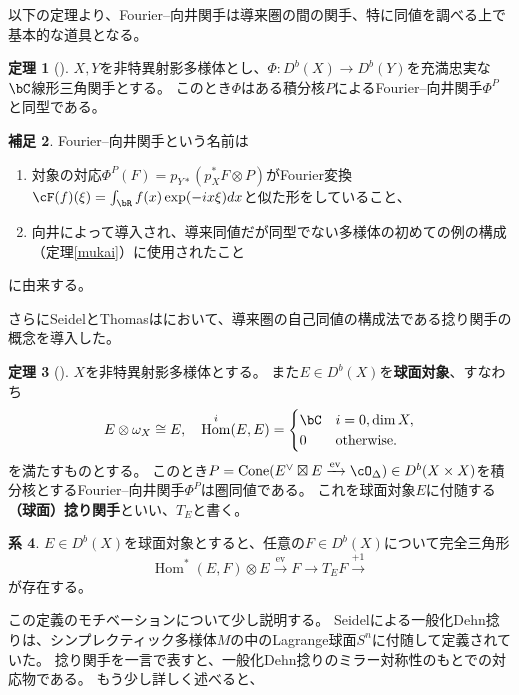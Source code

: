 \documentclass[uplatex,a4paper,dvipdfmx]{jsarticle}
\numberwithin{equation}{section}
\theoremstyle{definition}
\newtheorem{theorem}{定理}[section]
\newtheorem{corollary}[theorem]{系}
\newtheorem{remark}[theorem]{補足}
\DeclareMathOperator{\Hom}{\mathrm{Hom}}
\DeclareMathOperator{\Cone}{\mathrm{Cone}}
\DeclareMathOperator{\ev}{\mathrm{ev}}
\begin{document}
以下の定理より、Fourier--向井関手は導来圏の間の関手、特に同値を調べる上で基本的な道具となる。
\begin{theorem}[\cite{MR1465519}]
	$X, Y$を非特異射影多様体とし、$\Phi \colon D^b(X) \to D^b(Y)$を充満忠実な$\bC$線形三角関手とする。
	このとき$\Phi$はある積分核$P$によるFourier--向井関手$\Phi^P$と同型である。
\end{theorem}
\begin{remark}
	Fourier--向井関手という名前は
	\begin{enumerate}
		\item 対象の対応$\Phi^P(F) = p_{Y*}(p_X^*F \otimes P)$がFourier変換$\cF(f)(\xi) = \int_\bR f(x)\exp(-ix\xi)dx$と似た形をしていること、
		\item 向井\cite{MR607081}によって導入され、導来同値だが同型でない多様体の初めての例の構成（定理\ref{mukai}）に使用されたこと
	\end{enumerate}
	に由来する。
\end{remark}
さらにSeidelとThomasは\cite{MR1831820}において、導来圏の自己同値の構成法である捻り関手の概念を導入した。
\begin{theorem}[\cite{MR1831820}]
	$X$を非特異射影多様体とする。
	また$E \in D^b(X)$を\textbf{球面対象}、すなわち\begin{equation}
		E \otimes \omega_X \cong E,\quad \Hom^i(E, E) = \begin{cases}
			\bC & i = 0, \dim X,    \\
			0   & \text{otherwise.}
		\end{cases}
	\end{equation}を満たすものとする。
	このとき$P = \Cone(E^\vee \boxtimes E \xrightarrow{\ev} \cO_\Delta) \in D^b(X \times X)$を積分核とするFourier--向井関手$\Phi^P$は圏同値である。
	これを球面対象$E$に付随する\textbf{（球面）捻り関手}といい、$T_E$と書く。
\end{theorem}
\begin{corollary}
	$E \in D^b(X)$を球面対象とすると、任意の$F \in D^b(X)$について完全三角形
	\begin{equation}\label{eq:twist}
		\Hom^*(E, F) \otimes E \xrightarrow{\ev} F \to T_E F \xrightarrow{+1}
	\end{equation}
	が存在する。
\end{corollary}
この定義のモチベーションについて少し説明する。
Seidelによる一般化Dehn捻り\cite{MR1743463}は、シンプレクティック多様体$M$の中のLagrange球面$S^n$に付随して定義されていた。
捻り関手を一言で表すと、一般化Dehn捻りのミラー対称性のもとでの対応物である。
もう少し詳しく述べると、
\end{document}
